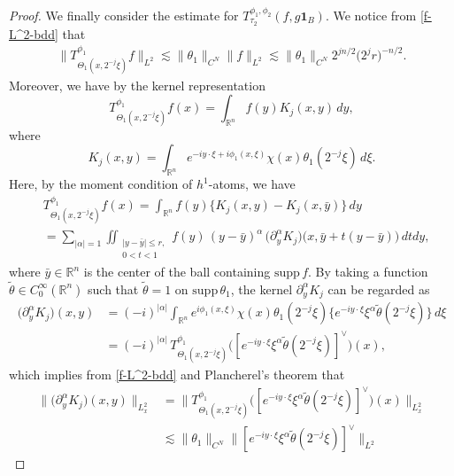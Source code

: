 \documentclass[12pt]{amsart}
\numberwithin{equation}{section}
\theoremstyle{plain}
\theoremstyle{definition}
\newcommand{\ichi}{\mathbf{1}}
\newcommand{\R}{\mathbb{R}}
\newcommand{\supp}{\mathrm{supp}\, }
\begin{document}
\begin{proof}
We finally consider the estimate
for $T_{ \tau_2 }^{\phi_1, \phi_2} (f, g\ichi_{B})$.
We notice from \eqref{f-L^2-bdd} that
\begin{align} \label{tau2-f-L^2}
\| T^{\phi_1}_{ \Theta_1 (x, 2^{-j} \xi) } f \|_{L^2} 
\lesssim 
\| \theta_1 \|_{ C^N } \|f\|_{ L^2 }
\lesssim 
\| \theta_1 \|_{ C^N } 2^{j n/2} \big( 2^{j} r \big)^{-n/2} .
\end{align}
Moreover, we have by the kernel representation
\[
T^{\phi_1}_{ \Theta_1 (x, 2^{-j} \xi) } f(x)
= 
\int_{\R^n} f(y) K_j(x, y) \,dy,
\]
where
\[
K_j(x, y)
= 
\int_{\R^n} e^{-i y \cdot \xi + i \phi_1 (x, \xi)} 
\chi(x) \theta_1 (2^{-j}\xi) \,d\xi .
\]
Here, by the moment condition of $h^1$-atoms,
we have
\begin{align*}&
T^{\phi_1}_{ \Theta_1 (x, 2^{-j} \xi) } f(x)
= 
\int_{\R^n} f(y) \Big\{ K_j(x, y) - K_j(x,\bar{y}) \Big\}
\,dy
\\& = 
\sum_{|\alpha|=1}
\iint_{ \substack{ |y-\bar{y}|\le r, \\ 0<t<1} }
f(y) \, (y-\bar{y})^{\alpha} \,
\big( \partial_{y}^{\alpha} K_j \big) \big(x, \bar{y}+t(y-\bar{y}) \big) 
\,dt dy ,
\end{align*}
where $\bar{y} \in \R^n$ is the center of the ball containing $\supp f$.
By taking a function $\widetilde{\theta} \in C^{\infty}_{0} (\R^n)$
such that $\widetilde{\theta} = 1$ on $\supp \theta_1$,
the kernel $\partial_{y}^{\alpha} K_j $ can be regarded as
\begin{align*}
\big( \partial_{y}^{\alpha} K_j \big) (x, y)
&=(-i)^{|\alpha|}
\int_{\R^n} e^{ i \phi_1 (x, \xi)} 
\chi(x) \theta_1 (2^{-j}\xi) 
\Big\{ e^{-i y \cdot \xi } \xi^{\alpha} 
\widetilde{\theta} (2^{-j}\xi) \Big\} 
\,d\xi 
\\&=(-i)^{|\alpha|} \,
T^{\phi_1}_{ \Theta_1 (x, 2^{-j} \xi) } 
\big( [e^{-i y \cdot \xi } \xi^{\alpha} 
\widetilde{\theta} (2^{-j}\xi)]^{\vee} \big)(x),
\end{align*}
which implies from 
\eqref{f-L^2-bdd} and Plancherel's theorem
that
\begin{align*}
\| \big( \partial_{y}^{\alpha} K_j \big) (x, y) \|_{L^2_{x}} 
&=
\| T^{\phi_1}_{ \Theta_1 (x, 2^{-j} \xi) } 
\big( [e^{-i y \cdot \xi } \xi^{\alpha} 
\widetilde{\theta} (2^{-j}\xi)]^{\vee} \big)(x) 
\|_{L^2_{x}} 
\\&\lesssim 
\| \theta_1 \|_{ C^N } 
\|[e^{-i y \cdot \xi } \xi^{\alpha} 
\widetilde{\theta} (2^{-j}\xi)]^{\vee} 
\|_{ L^2 }

\end{align*}
\end{proof}
\end{document}
